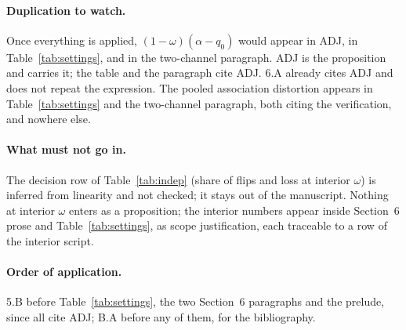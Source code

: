 \documentclass[11pt,a4paper]{article}
\begin{document}
\paragraph{Duplication to watch.} Once everything is applied,
$(1-\omega)(\alpha-q_0)$ would appear in ADJ, in Table~\ref{tab:settings},
and in the two-channel paragraph. ADJ is the proposition and carries it; the
table and the paragraph cite ADJ. 6.A already cites ADJ and does not repeat
the expression. The pooled association distortion appears in
Table~\ref{tab:settings} and the two-channel paragraph, both citing the
verification, and nowhere else.

\paragraph{What must not go in.} The decision row of Table~\ref{tab:indep}
(share of flips and loss at interior $\omega$) is inferred from linearity and
not checked; it stays out of the manuscript. Nothing at interior $\omega$
enters as a proposition; the interior numbers appear inside Section~6 prose
and Table~\ref{tab:settings}, as scope justification, each traceable to a row
of the interior script.

\paragraph{Order of application.} 5.B before Table~\ref{tab:settings}, the
two Section~6 paragraphs and the prelude, since all cite ADJ; B.A before any
of them, for the bibliography.
\end{document}
